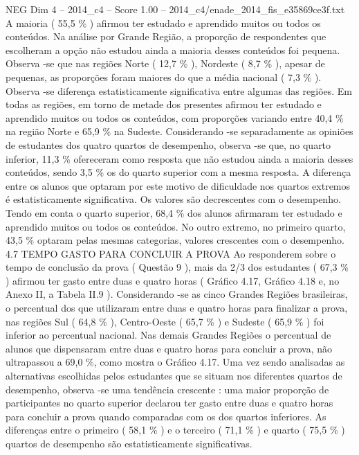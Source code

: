 \begin{textsample}{NEG Dim 4 – 2014\_c4 – Score 1.00 – 2014\_c4/enade\_2014\_fis\_e35869ce3f.txt}
A maioria ( 55,5 \% ) afirmou ter estudado e aprendido muitos ou todos os conteúdos.
Na análise por Grande Região, a proporção de respondentes que escolheram a opção não estudou ainda a maioria desses conteúdos foi pequena.
Observa -se que nas regiões Norte ( 12,7 \% ), Nordeste ( 8,7 \% ), apesar de pequenas, as proporções foram maiores do que a média nacional ( 7,3 \% ).
Observa -se diferença estatisticamente significativa entre algumas das regiões.
Em todas as regiões, em torno de metade dos presentes afirmou ter estudado e aprendido muitos ou todos os conteúdos, com proporções variando entre 40,4 \% na região Norte e 65,9 \% na Sudeste.
Considerando -se separadamente as opiniões de estudantes dos quatro quartos de desempenho, observa -se que, no quarto inferior, 11,3 \% ofereceram como resposta que não estudou ainda a maioria desses conteúdos, sendo 3,5 \% os do quarto superior com a mesma resposta.
A diferença entre os alunos que optaram por este motivo de dificuldade nos quartos extremos é estatisticamente significativa.
Os valores são decrescentes com o desempenho.
Tendo em conta o quarto superior, 68,4 \% dos alunos afirmaram ter estudado e aprendido muitos ou todos os conteúdos.
No outro extremo, no primeiro quarto, 43,5 \% optaram pelas mesmas categorias, valores crescentes com o desempenho. 4.7 TEMPO GASTO PARA CONCLUIR A PROVA Ao responderem sobre o tempo de conclusão da prova ( Questão 9 ), mais da 2/3 dos estudantes ( 67,3 \% ) afirmou ter gasto entre duas e quatro horas ( Gráfico 4.17, Gráfico 4.18 e, no Anexo II, a Tabela II.9 ).
Considerando -se as cinco Grandes Regiões brasileiras, o percentual dos que utilizaram entre duas e quatro horas para finalizar a prova, nas regiões Sul ( 64,8 \% ), Centro-Oeste ( 65,7 \% ) e Sudeste ( 65,9 \% ) foi inferior ao percentual nacional.
Nas demais Grandes Regiões o percentual de alunos que dispensaram entre duas e quatro horas para concluir a prova, não ultrapassou a 69,0 \%, como mostra o Gráfico 4.17.
Uma vez sendo analisadas as alternativas escolhidas pelos estudantes que se situam nos diferentes quartos de desempenho, observa -se uma tendência crescente : uma maior proporção de participantes no quarto superior declarou ter gasto entre duas e quatro horas para concluir a prova quando comparadas com os dos quartos inferiores.
As diferenças entre o primeiro ( 58,1 \% ) e o terceiro ( 71,1 \% ) e quarto ( 75,5 \% ) quartos de desempenho são estatisticamente significativas.

\end{textsample}
